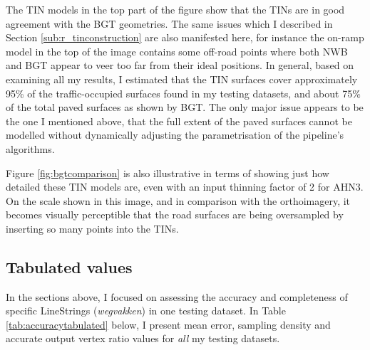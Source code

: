 The TIN models in the top part of the figure show that the TINs are in good agreement with the BGT geometries. The same issues which I described in Section \ref{sub:r_tinconstruction} are also manifested here, for instance the on-ramp model in the top of the image contains some off-road points where both NWB and BGT appear to veer too far from their ideal positions. In general, based on examining all my results, I estimated that the TIN surfaces cover approximately 95\% of the traffic-occupied surfaces found in my testing datasets, and about 75\% of the total paved surfaces as shown by BGT. The only major issue appears to be the one I mentioned above, that the full extent of the paved surfaces cannot be modelled without dynamically adjusting the parametrisation of the pipeline's algorithms.

Figure \ref{fig:bgtcomparison} is also illustrative in terms of showing just how detailed these TIN models are, even with an input thinning factor of 2 for AHN3. On the scale shown in this image, and in comparison with the orthoimagery, it becomes visually perceptible that the road surfaces are being oversampled by inserting so many points into the TINs.

\subsection{Tabulated values}
\label{sub:accuracytabulated}

In the sections above, I focused on assessing the accuracy and completeness of specific LineStrings (\textit{wegvakken}) in one testing dataset. In Table \ref{tab:accuracytabulated} below, I present mean error, sampling density and accurate output vertex ratio values for \textit{all} my testing datasets.

\begin{table}
    \caption{Tabulated 3D-NWB accuracy and completeness results per testing dataset.
    \label{tab:accuracytabulated}}
\end{table}

